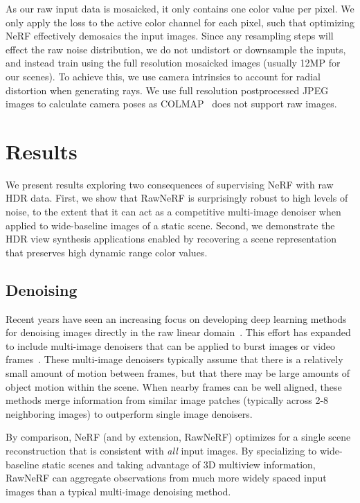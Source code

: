 As our raw input data is mosaicked, it only contains one color value per pixel. We  
only apply the loss to the active color channel for each pixel,
such that optimizing NeRF effectively demosaics the input images. 
Since any resampling steps will effect the raw noise distribution, we do not undistort or downsample the inputs, and instead train using the full resolution mosaicked images (usually 12MP for our scenes).
To achieve this, we use camera intrinsics to account for radial distortion when generating rays.
We use full resolution postprocessed JPEG images to calculate camera poses as COLMAP~\cite{colmap} does not support raw images.






\section{Results}
\label{sec:results}

We present results exploring two consequences of supervising NeRF with raw HDR data. First, we show that RawNeRF is surprisingly robust to high levels of noise, to the extent that it can act as a competitive multi-image denoiser when applied to wide-baseline images of a static scene. Second, we demonstrate the HDR view synthesis applications enabled by recovering a scene representation that preserves high dynamic range color values.

\subsection{Denoising}


Recent years have seen an increasing focus on developing deep learning methods for denoising images directly in the raw linear domain~\cite{brooks2019cvpr,chen2018cvpr}. This effort has expanded to include multi-image denoisers that can be applied to burst images or video frames~\cite{chen2019iccv,rvidenet,udvd}. These multi-image denoisers typically assume that there is a relatively small amount of motion between frames, but that there may be large amounts of object motion within the scene. When nearby frames can be well aligned, these methods merge information from similar image patches (typically across 2-8 neighboring images) to outperform single image denoisers.

By comparison, NeRF (and by extension, RawNeRF) optimizes for a single scene reconstruction that is consistent with \emph{all} input images. By specializing to wide-baseline static scenes and taking advantage of 3D multiview information, RawNeRF can aggregate observations from much more widely spaced input images than a typical multi-image denoising method. 


